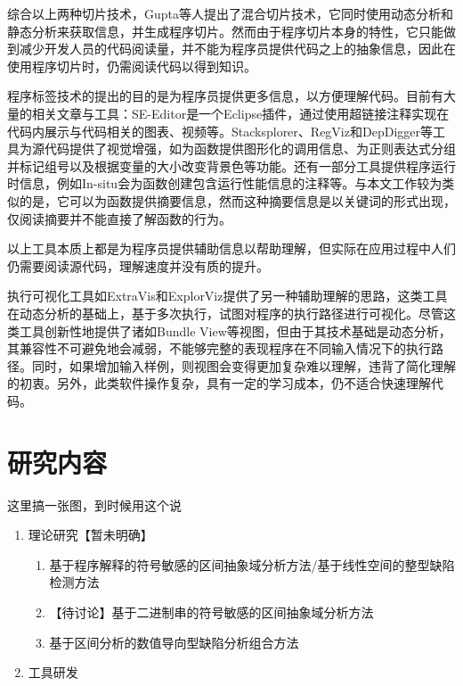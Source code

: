  综合以上两种切片技术，Gupta\cite{gupta1997hybrid}等人提出了混合切片技术，它同时使用动态分析和静态分析来获取信息，并生成程序切片。然而由于程序切片本身的特性，它只能做到减少开发人员的代码阅读量，并不能为程序员提供代码之上的抽象信息，因此在使用程序切片时，仍需阅读代码以得到知识。 
 
 程序标签技术的提出的目的是为程序员提供更多信息，以方便理解代码。目前有大量的相关文章与工具：SE-Editor\cite{schugerl2009beyond}是一个Eclipse插件，通过使用超链接注释实现在代码内展示与代码相关的图表、视频等。Stacksplorer\cite{karrer2011stacksplorer}、RegViz\cite{beck2014regviz}和DepDigger\cite{beyer2010depdigger}等工具为源代码提供了视觉增强，如为函数提供图形化的调用信息、为正则表达式分组并标记组号以及根据变量的大小改变背景色等功能。还有一部分工具提供程序运行时信息，例如In-situ\cite{beck2013situ}会为函数创建包含运行性能信息的注释等。与本文工作较为类似的是\cite{haiduc2010supporting}，它可以为函数提供摘要信息，然而这种摘要信息是以关键词的形式出现，仅阅读摘要并不能直接了解函数的行为。
 
 以上工具本质上都是为程序员提供辅助信息以帮助理解，但实际在应用过程中人们仍需要阅读源代码，理解速度并没有质的提升。 
 
 执行可视化工具如ExtraVis\cite{cornelissen2007understanding}和ExplorViz\cite{fittkau2013live}提供了另一种辅助理解的思路，这类工具在动态分析的基础上，基于多次执行，试图对程序的执行路径进行可视化。尽管这类工具创新性地提供了诸如Bundle View等视图，但由于其技术基础是动态分析，其兼容性不可避免地会减弱，不能够完整的表现程序在不同输入情况下的执行路径。同时，如果增加输入样例，则视图会变得更加复杂难以理解，违背了简化理解的初衷。另外，此类软件操作复杂，具有一定的学习成本，仍不适合快速理解代码。
 
 \section{研究内容}
 
 这里搞一张图，到时候用这个说
 
 \begin{enumerate}
 	
 	\item 理论研究【暂未明确】
	 	\begin{enumerate}
	 		\item 基于程序解释的符号敏感的区间抽象域分析方法/基于线性空间的整型缺陷检测方法
	 		\item 【待讨论】基于二进制串的符号敏感的区间抽象域分析方法
	 		\item 基于区间分析的数值导向型缺陷分析组合方法
	 	\end{enumerate}
 	
 	\item 工具研发
 	
 \end{enumerate}
 
